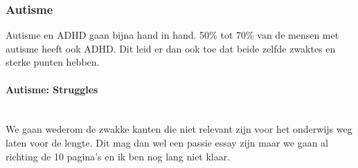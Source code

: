     
            \subsubsection{Autisme}
               Autisme en ADHD gaan bijna hand in hand. 50\% tot 70\% van de mensen met autisme heeft ook ADHD\cite{ADHD-en-autisme-overlap}. Dit leid er dan ook toe dat beide zelfde zwaktes en sterke punten hebben.\\
    
                \noindent\paragraph{Autisme: Struggles}\\
                    We gaan wederom de zwakke kanten die niet relevant zijn voor het onderwijs weg laten voor de lengte. Dit mag dan wel een passie essay zijn maar we gaan al richting de 10 pagina's en ik ben nog lang niet klaar.
